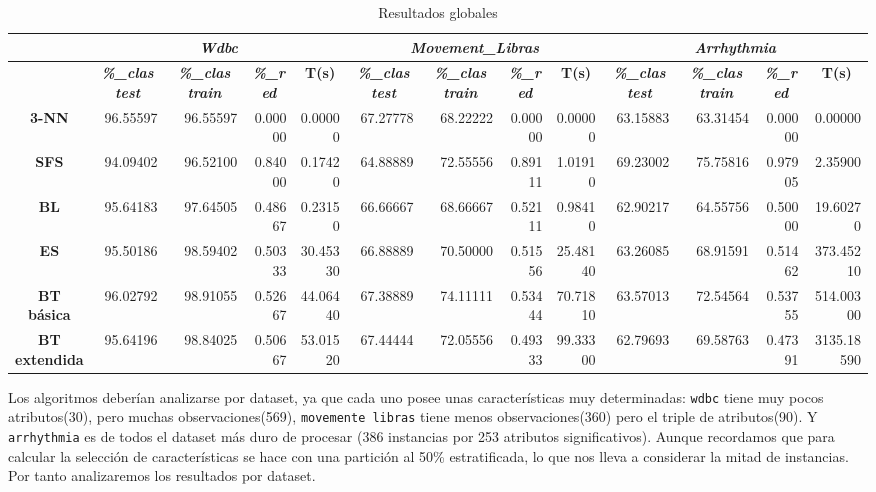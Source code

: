 \documentclass[a4paper,11pt]{article}
\begin{document}
  
  \begin{table}[H]
  \caption*{Resultados globales}
  \begin{adjustbox}{width=1.1\textwidth}
  \begin{tabular}{|c|r|r|r|r|r|r|r|r|r|r|r|r|}
  \hline
  \multicolumn{1}{|l|}{} & \multicolumn{ 4}{c|}{\textbf{\textit{Wdbc}}} & \multicolumn{ 4}{c|}{\textbf{\textit{Movement\_Libras}}} & \multicolumn{ 4}{c|}{\textbf{\textit{Arrhythmia}}} \\ \hline
  & \multicolumn{1}{c|}{\textbf{\textit{\%\_clas test}}} & \multicolumn{1}{c|}{\textbf{\textit{\%\_clas train}}} & \multicolumn{1}{c|}{\textbf{\textit{\%\_red}}} & \multicolumn{1}{c|}{\textbf{T(s)}} & \multicolumn{1}{c|}{\textbf{\textit{\%\_clas test}}} & \multicolumn{1}{c|}{\textbf{\textit{\%\_clas train}}} & \multicolumn{1}{c|}{\textbf{\textit{\%\_red}}} & \multicolumn{1}{c|}{\textbf{T(s)}} & \multicolumn{1}{c|}{\textbf{\textit{\%\_clas test}}} & \multicolumn{1}{c|}{\textbf{\textit{\%\_clas train}}} & \multicolumn{1}{c|}{\textbf{\textit{\%\_red}}} & \multicolumn{1}{c|}{\textbf{T(s)}} \\ \hline
  \textbf{3-NN} & 96.55597 & 96.55597 & 0.00000 & 0.00000 & 67.27778 & 68.22222 & 0.00000 & 0.00000 & 63.15883 & 63.31454 & 0.00000 & 0.00000 \\ \hline
  \textbf{SFS} & 94.09402 & 96.52100 & 0.84000 & 0.17420 & 64.88889 & 72.55556 & 0.89111 & 1.01910 & 69.23002 & 75.75816 & 0.97905 & 2.35900 \\ \hline
  \textbf{BL} & 95.64183 & 97.64505 & 0.48667 & 0.23150 & 66.66667 & 68.66667 & 0.52111 & 0.98410 & 62.90217 & 64.55756 & 0.50000 & 19.60270 \\ \hline
  \textbf{ES} & 95.50186 & 98.59402 & 0.50333 & 30.45330 & 66.88889 & 70.50000 & 0.51556 & 25.48140 & 63.26085 & 68.91591 & 0.51462 & 373.45210 \\ \hline
  \textbf{BT básica} & 96.02792 & 98.91055 & 0.52667 & 44.06440 & 67.38889 & 74.11111 & 0.53444 & 70.71810 & 63.57013 & 72.54564 & 0.53755 & 514.00300 \\ \hline
  \textbf{BT extendida} & 95.64196 & 98.84025 & 0.50667 & 53.01520 & 67.44444 & 72.05556 & 0.49333 & 99.33300 & 62.79693 & 69.58763 & 0.47391 & 3135.18590 \\ \hline
  \end{tabular}
  \end{adjustbox}
  \label{}
  \end{table}

  
  Los algoritmos deberían analizarse por dataset, ya que cada uno posee unas características muy determinadas: \texttt{wdbc} tiene muy pocos atributos(30), pero muchas observaciones(569),
  \texttt{movemente libras} tiene menos observaciones(360) pero el triple de atributos(90). Y \texttt{arrhythmia} es de todos el dataset más duro de procesar (386 instancias por 253 atributos
  significativos). Aunque recordamos que para calcular la selección de características se hace con una partición al 50\% estratificada, lo que nos lleva a considerar la mitad de instancias.
  Por tanto analizaremos los resultados por dataset.
  
\end{document}
